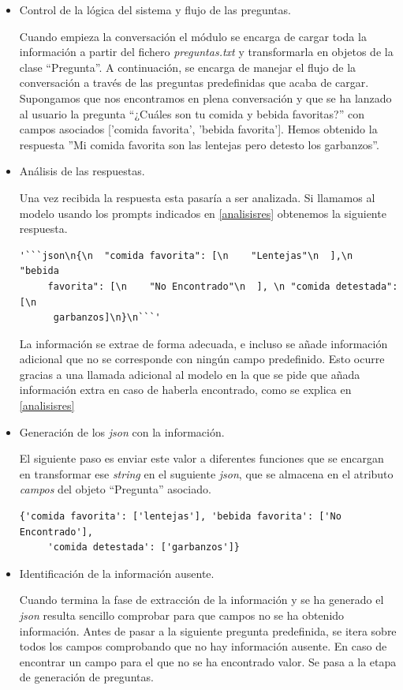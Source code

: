 \begin{itemize}
	\item Control de la lógica del sistema y flujo de las preguntas.
	
	 Cuando empieza la conversación el módulo se encarga de cargar toda la información a partir del fichero \textit{preguntas.txt} y transformarla en objetos de la clase ``Pregunta''. A continuación, se encarga de manejar el flujo de la conversación a través de las preguntas predefinidas que acaba de cargar. Supongamos que nos encontramos en plena conversación y que se ha lanzado al usuario la pregunta ``¿Cuáles son tu comida y bebida favoritas?'' con campos asociados ['comida favorita', 'bebida favorita']. Hemos obtenido la respuesta ''Mi comida favorita son las lentejas pero detesto los garbanzos''.
	
	\item Análisis de las respuestas.
	
	 Una vez recibida la respuesta esta pasaría a ser analizada. Si llamamos al modelo usando los prompts indicados en \ref{analisisres} obtenemos la siguiente respuesta. 
\begin{verbatim}
'```json\n{\n  "comida favorita": [\n    "Lentejas"\n  ],\n  "bebida
	 favorita": [\n    "No Encontrado"\n  ], \n "comida detestada":[\n
	  garbanzos]\n}\n```'
\end{verbatim}

La información se extrae de forma adecuada, e incluso se añade información adicional que no se corresponde con ningún campo predefinido. Esto ocurre gracias a una llamada adicional al modelo en la que se pide que añada información extra en caso de haberla encontrado, como se explica en \ref{analisisres}

	\item Generación de los \textit{json} con la información.

El siguiente paso es enviar este valor a diferentes funciones que se encargan en transformar ese \textit{string} en el suguiente \textit{json}, que se almacena en el atributo \textit{campos} del objeto ``Pregunta'' asociado. 
\begin{verbatim}
{'comida favorita': ['lentejas'], 'bebida favorita': ['No Encontrado'],
	 'comida detestada': ['garbanzos']}
\end{verbatim}

	\item Identificación de la información ausente.
	
	 Cuando termina la fase de extracción de la información y se ha generado el \textit{json} resulta sencillo comprobar para que campos no se ha obtenido información. Antes de pasar a la siguiente pregunta predefinida, se itera sobre todos los campos comprobando que no hay información ausente. En caso de encontrar un campo para el que no se ha encontrado valor. Se pasa a la etapa de generación de preguntas. 
	

\end{itemize}
